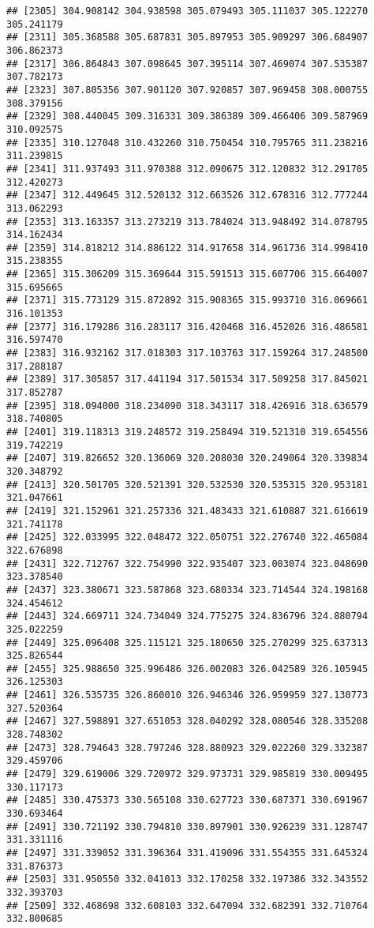 \documentclass[]{article}
\begin{document}
\begin{verbatim}
## [2305] 304.908142 304.938598 305.079493 305.111037 305.122270 305.241179
## [2311] 305.368588 305.687831 305.897953 305.909297 306.684907 306.862373
## [2317] 306.864843 307.098645 307.395114 307.469074 307.535387 307.782173
## [2323] 307.805356 307.901120 307.920857 307.969458 308.000755 308.379156
## [2329] 308.440045 309.316331 309.386389 309.466406 309.587969 310.092575
## [2335] 310.127048 310.432260 310.750454 310.795765 311.238216 311.239815
## [2341] 311.937493 311.970388 312.090675 312.120832 312.291705 312.420273
## [2347] 312.449645 312.520132 312.663526 312.678316 312.777244 313.062293
## [2353] 313.163357 313.273219 313.784024 313.948492 314.078795 314.162434
## [2359] 314.818212 314.886122 314.917658 314.961736 314.998410 315.238355
## [2365] 315.306209 315.369644 315.591513 315.607706 315.664007 315.695665
## [2371] 315.773129 315.872892 315.908365 315.993710 316.069661 316.101353
## [2377] 316.179286 316.283117 316.420468 316.452026 316.486581 316.597470
## [2383] 316.932162 317.018303 317.103763 317.159264 317.248500 317.288187
## [2389] 317.305857 317.441194 317.501534 317.509258 317.845021 317.852787
## [2395] 318.094000 318.234090 318.343117 318.426916 318.636579 318.740805
## [2401] 319.118313 319.248572 319.258494 319.521310 319.654556 319.742219
## [2407] 319.826652 320.136069 320.208030 320.249064 320.339834 320.348792
## [2413] 320.501705 320.521391 320.532530 320.535315 320.953181 321.047661
## [2419] 321.152961 321.257336 321.483433 321.610887 321.616619 321.741178
## [2425] 322.033995 322.048472 322.050751 322.276740 322.465084 322.676898
## [2431] 322.712767 322.754990 322.935407 323.003074 323.048690 323.378540
## [2437] 323.380671 323.587868 323.680334 323.714544 324.198168 324.454612
## [2443] 324.669711 324.734049 324.775275 324.836796 324.880794 325.022259
## [2449] 325.096408 325.115121 325.180650 325.270299 325.637313 325.826544
## [2455] 325.988650 325.996486 326.002083 326.042589 326.105945 326.125303
## [2461] 326.535735 326.860010 326.946346 326.959959 327.130773 327.520364
## [2467] 327.598891 327.651053 328.040292 328.080546 328.335208 328.748302
## [2473] 328.794643 328.797246 328.880923 329.022260 329.332387 329.459706
## [2479] 329.619006 329.720972 329.973731 329.985819 330.009495 330.117173
## [2485] 330.475373 330.565108 330.627723 330.687371 330.691967 330.693464
## [2491] 330.721192 330.794810 330.897901 330.926239 331.128747 331.331116
## [2497] 331.339052 331.396364 331.419096 331.554355 331.645324 331.876373
## [2503] 331.950550 332.041013 332.170258 332.197386 332.343552 332.393703
## [2509] 332.468698 332.608103 332.647094 332.682391 332.710764 332.800685

\end{verbatim}
\end{document}
